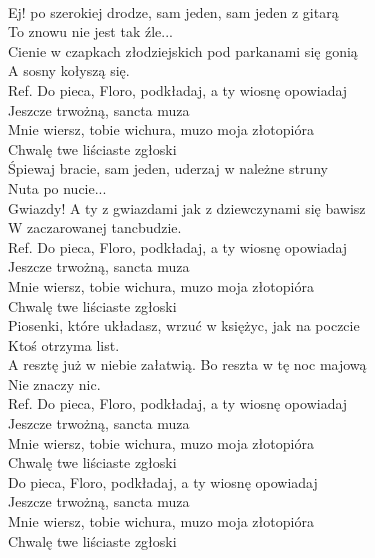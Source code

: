 
\tab{}\tab{}\\
Ej! po szerokiej drodze, sam jeden, sam jeden z gitarą  \\
To znowu nie jest tak źle... \tab{}\tab{}\\
Cienie w czapkach złodziejskich pod parkanami się gonią \\
A sosny kołyszą się. \tab{}\tab{}\\
\hops
Ref. Do pieca, Floro, podkładaj, a ty wiosnę opowiadaj \\
 Jeszcze trwożną, sancta muza \tab{}\\
 Mnie wiersz, tobie wichura, muzo moja złotopióra  \\
 Chwalę twe liściaste zgłoski \tab{}\\
\hops
Śpiewaj bracie, sam jeden, uderzaj w należne struny \\
Nuta po nucie... \\
Gwiazdy! A ty z gwiazdami jak z dziewczynami się bawisz \\
W zaczarowanej tancbudzie. \\
\hops
Ref. Do pieca, Floro, podkładaj, a ty wiosnę opowiadaj \\
 Jeszcze trwożną, sancta muza \\
 Mnie wiersz, tobie wichura, muzo moja złotopióra \\
 Chwalę twe liściaste zgłoski \\
\hops
Piosenki, które układasz, wrzuć w księżyc, jak na poczcie \\
Ktoś otrzyma list. \\
A resztę już w niebie załatwią. Bo reszta w tę noc majową \\
Nie znaczy nic.  \\
\hops
Ref. Do pieca, Floro, podkładaj, a ty wiosnę opowiadaj \\ 
 Jeszcze trwożną, sancta muza \\
 Mnie wiersz, tobie wichura, muzo moja złotopióra \\
 Chwalę twe liściaste zgłoski \\
\hops
{} Do pieca, Floro, podkładaj, a ty wiosnę opowiadaj \\
 Jeszcze trwożną, sancta muza \\
 Mnie wiersz, tobie wichura, muzo moja złotopióra \\
 Chwalę twe liściaste zgłoski 